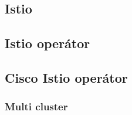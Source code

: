 \chapter{\istio}
\section{Istio}
\section{Istio operátor}
\section{Cisco Istio operátor}
\subsection{Multi cluster}